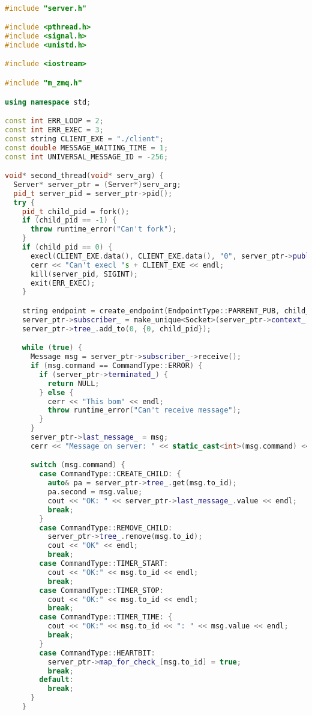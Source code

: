 \begin{lstlisting}[language=C++]

#include "server.h"

#include <pthread.h>
#include <signal.h>
#include <unistd.h>

#include <iostream>

#include "m_zmq.h"

using namespace std;

const int ERR_LOOP = 2;
const int ERR_EXEC = 3;
const string CLIENT_EXE = "./client";
const double MESSAGE_WAITING_TIME = 1;
const int UNIVERSAL_MESSAGE_ID = -256;

void* second_thread(void* serv_arg) {
  Server* server_ptr = (Server*)serv_arg;
  pid_t server_pid = server_ptr->pid();
  try {
    pid_t child_pid = fork();
    if (child_pid == -1) {
      throw runtime_error("Can't fork");
    }
    if (child_pid == 0) {
      execl(CLIENT_EXE.data(), CLIENT_EXE.data(), "0", server_ptr->publiser_->endpoint().data(), NULL);
      cerr << "Can't execl "s + CLIENT_EXE << endl;
      kill(server_pid, SIGINT);
      exit(ERR_EXEC);
    }

    string endpoint = create_endpoint(EndpointType::PARRENT_PUB, child_pid);
    server_ptr->subscriber_ = make_unique<Socket>(server_ptr->context_, SocketType::SUBSCRIBER, endpoint);
    server_ptr->tree_.add_to(0, {0, child_pid});

    while (true) {
      Message msg = server_ptr->subscriber_->receive();
      if (msg.command == CommandType::ERROR) {
        if (server_ptr->terminated_) {
          return NULL;
        } else {
          cerr << "This bom" << endl;
          throw runtime_error("Can't receive message");
        }
      }
      server_ptr->last_message_ = msg;
      cerr << "Message on server: " << static_cast<int>(msg.command) << " " << msg.to_id << " " << msg.value << endl;

      switch (msg.command) {
        case CommandType::CREATE_CHILD: {
          auto& pa = server_ptr->tree_.get(msg.to_id);
          pa.second = msg.value;
          cout << "OK: " << server_ptr->last_message_.value << endl;
          break;
        }
        case CommandType::REMOVE_CHILD:
          server_ptr->tree_.remove(msg.to_id);
          cout << "OK" << endl;
          break;
        case CommandType::TIMER_START:
          cout << "OK:" << msg.to_id << endl;
          break;
        case CommandType::TIMER_STOP:
          cout << "OK:" << msg.to_id << endl;
          break;
        case CommandType::TIMER_TIME: {
          cout << "OK:" << msg.to_id << ": " << msg.value << endl;
          break;
        }
        case CommandType::HEARTBIT:
          server_ptr->map_for_check_[msg.to_id] = true;
          break;
        default:
          break;
      }
    }


\end{lstlisting}
